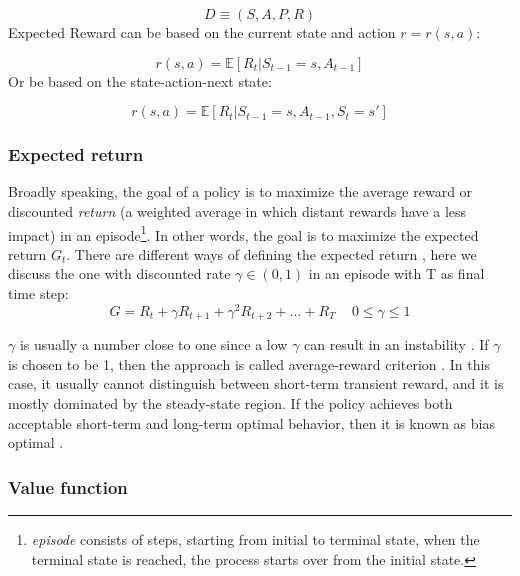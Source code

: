 \begin{equation}
	D\equiv (S, A, P, R)
\end{equation}
Expected Reward can be based on the current state and action $r = r(s,a)$:

\begin{equation}
	r(s,a) = \mathbb{E}[R_t|S_{t-1}=s,A_{t-1}]
\end{equation}
Or be based on the state-action-next state:

\begin{equation}
	r(s,a) = \mathbb{E}[R_t|S_{t-1}=s,A_{t-1},S_t=s']
\end{equation}
\subsubsection{Expected return}
Broadly speaking, the goal of a policy is to maximize the  average reward or discounted \textit{return} (a weighted average in which distant rewards have a less impact) in an episode\footnote{\textit{episode} consists of steps, starting from initial to terminal state, when the terminal state is reached, the process starts over from the initial state.}. In other words, the goal is to maximize the expected return $G_t$. There are different ways of defining the expected return \cite{kaelbling1996reinforcement}, here we discuss the one with discounted rate $\gamma \in (0,1)$ in an episode with T as final time step:\\

\begin{equation}
	G = R_{t}+\gamma R_{t+1}+ \gamma^2 R_{t+2}+ \dots + R_T\, \quad 0 \leq\gamma\leq 1 
\end{equation}

$\gamma$ is usually a number close to one since a low $\gamma$ can result in an instability \cite{kober2013reinforcement}. If $\gamma$ is chosen to be 1, then the approach is called average-reward criterion \cite{bertsekas2011dynamic}. In this case, it usually cannot distinguish between short-term transient reward, and it is mostly dominated by the steady-state region. If the policy achieves both acceptable short-term and long-term optimal behavior, then it is known as bias optimal \cite{lewis2002bias}. \\

\subsubsection{Value function}

